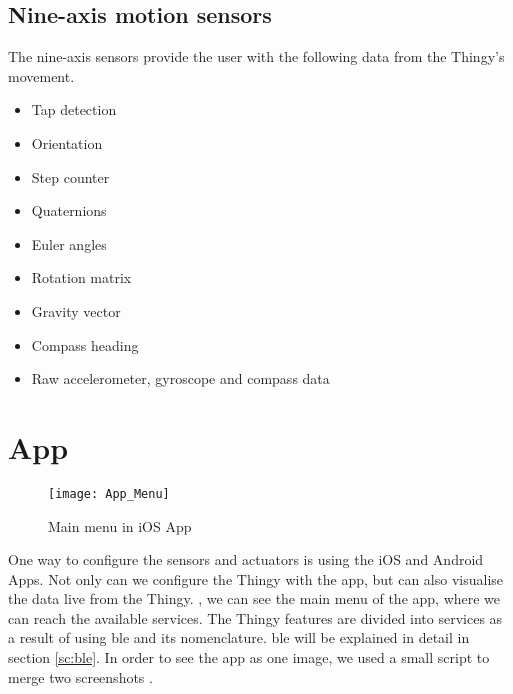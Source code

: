 \subsection{Nine-axis motion sensors}\label{sc:features_mot}
The nine-axis sensors provide the user with the following data from the Thingy's movement.
\begin{itemize}
	\item Tap detection
	\item Orientation
	\item Step counter
	\item Quaternions
	\item Euler angles
	\item Rotation matrix
	\item Gravity vector
	\item Compass heading
	\item Raw accelerometer, gyroscope and compass data
\end{itemize}

\section{App}
\begin{figure}[hbt!]
	\centering
	\texttt{[image: App\_Menu]}
	\caption{Main menu in iOS App}
	\label{fig:app_menu}
\end{figure}
One way to configure the sensors and actuators is using the iOS and Android Apps. Not only can we configure the Thingy with the app, but can also visualise the data live from the Thingy. , we can see the main menu of the app, where we can reach the available services. The Thingy features are divided into services as a result of using \gls{ble} and its nomenclature. \gls{ble} will be explained in detail in section \ref{sc:ble}. In order to see the app as one image, we used a small script to merge two screenshots .


